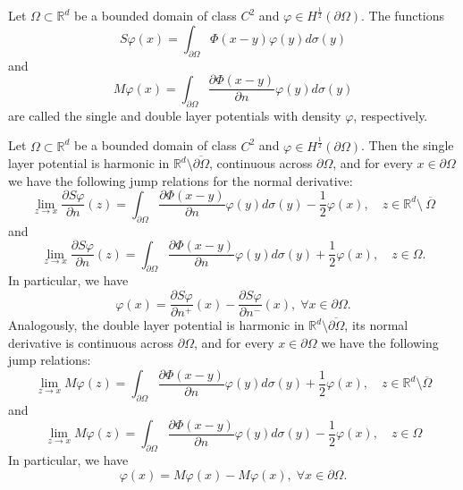 \begin{definition}\label{definition_single_and_double_layer_potentials}
    Let \(\Omega \subset \mathbb{R}^d\) be a bounded domain of class \(C^2\) and \(\varphi \in H^\frac{1}{2}(\partial\Omega)\). The functions
    \[
        S\varphi(x) = \int_{\partial\Omega} \Phi(x-y)\varphi(y) d\sigma(y)
    \]
    and
    \[
        M\varphi(x) = \int_{\partial\Omega} \frac{\partial \Phi(x-y)}{\partial n}\varphi(y) d\sigma(y)
    \]
    are called the single and double layer potentials with density \(\varphi\), respectively.
\end{definition}
\begin{proposition}\label{sl_jump}
    Let \(\Omega  \subset \mathbb{R}^d\) be a bounded domain of class \(C^2\) and \(\varphi \in H^\frac{1}{2}(\partial\Omega)\). Then the single layer potential is harmonic in \(\mathbb{R}^d\setminus \overline{\partial\Omega}\), continuous across \(\partial\Omega\), and for every \(x \in \partial\Omega\) we have the following jump relations for the normal derivative:
    \[
        \lim_{z \rightarrow x} \frac{\partial S\varphi}{\partial n}(z) = \int_{\partial\Omega} \frac{\partial\Phi(x-y)}{\partial n}\varphi(y) d\sigma(y) - \frac{1}{2}\varphi(x), \quad z \in \mathbb{R}^d \setminus \ \overline{\Omega}
    \]
    and
    \[
        \lim_{z \rightarrow x} \frac{\partial S\varphi}{\partial n}(z) = \int_{\partial\Omega} \frac{\partial\Phi(x-y)}{\partial n}\varphi(y) d\sigma(y) + \frac{1}{2}\varphi(x), \quad z \in \Omega.
    \]
    In particular, we have
    \[
        \varphi(x) = \frac{\partial S\varphi}{\partial n^+}(x)-\frac{\partial S\varphi}{\partial n^-}(x), \; \forall x \in \partial\Omega.
    \]
    Analogously, the double layer potential is harmonic in \(\mathbb{R}^d\setminus \overline{\partial\Omega}\), its normal derivative is continuous across \(\partial\Omega\), and for every \(x \in \partial\Omega\) we have the following jump relations:
    \[
        \lim_{z \rightarrow x} M\varphi(z) = \int_{\partial\Omega} \frac{\partial\Phi(x-y)}{\partial n}\varphi(y) d\sigma(y) + \frac{1}{2}\varphi(x), \quad z \in \mathbb{R}^d\setminus\overline{\Omega}
    \]
    and
    \[
        \lim_{z \rightarrow x} M\varphi(z) = \int_{\partial\Omega} \frac{\partial\Phi(x-y)}{\partial n}\varphi(y) d\sigma(y) - \frac{1}{2}\varphi(x), \quad z \in \Omega
    \]
    In particular, we have
    \[
        \varphi(x) = M\varphi(x)-M\varphi(x), \; \forall x \in \partial\Omega.
    \]



\end{proposition}
